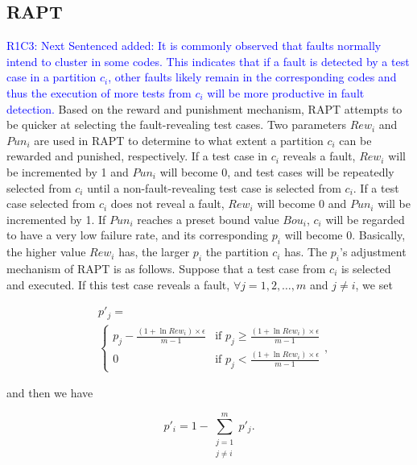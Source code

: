 \documentclass[10pt,journal,compsoc]{IEEEtran}
\begin{document}
\subsection{RAPT}
\textcolor{blue}{R1C3: Next Sentenced added: It is commonly observed that faults normally intend to cluster in some codes. This indicates that if a fault is detected by a test case in a partition $c_i$, other faults likely remain in the corresponding codes and thus the execution of more tests from $c_i$ will be more productive in fault detection.}
Based on the reward and punishment mechanism, RAPT attempts to be quicker at selecting the fault-revealing test cases. Two parameters $Rew_i$ and $Pun_i$ are used in RAPT to determine to what extent a partition $c_i$ can be rewarded and punished, respectively. If a test case in $c_i$ reveals a fault, $Rew_i$ will be incremented by 1 and $Pun_i$ will become 0, and test cases will be repeatedly selected from $c_i$ until a non-fault-revealing test case is selected from $c_i$. If a test case selected from $c_i$ does not reveal a fault, $Rew_i$ will become 0 and $Pun_i$ will be incremented by 1. If $Pun_i$ reaches a preset bound value $Bou_i$, $c_i$ will be regarded to have a very low failure rate, and its corresponding $p_i$ will become 0.
Basically, the higher value $Rew_i$ has, the larger $p_i$ the partition $c_i$ has. The $p_i$'s adjustment mechanism of RAPT is as follows. Suppose that a test case from $c_i$ is selected and executed. If this test case reveals a fault, $\forall j = 1, 2, \ldots, m$ and $j \neq i$, we set

\begin{equation}
\label{eq:RAPThitJ}
\begin{split}
& p'_j = \\
& \begin{cases}
p_j - \displaystyle\frac{(1 + \ln Rew_i) \times \epsilon}{m-1} & \text{if } p_j \geq \displaystyle\frac{(1 + \ln Rew_i) \times \epsilon}{m-1} \\
0 & \text{if } p_j < \displaystyle\frac{(1 + \ln Rew_i) \times \epsilon}{m-1}
\end{cases},
\end{split}
\end{equation}

and then we have

\begin{equation}
\label{eq:RAPThitI}
p'_i = 1 - \sum_{\substack{j = 1 \\ j \neq i}}^m p'_j.
\end{equation}
\end{document}
